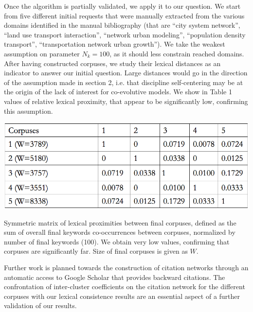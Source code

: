 



Once the algorithm is partially validated, we apply it to our question. We start from five different initial requests that were manually extracted from the various domains identified in the manual bibliography (that are ``city system network'', ``land use transport interaction'', ``network urban modeling'', ``population density transport'', ``transportation network urban growth''). We take the weakest assumption on parameter $N_k=100$, as it should less  constrain reached domains. After having constructed corpuses, we study their lexical distances as an indicator to answer our initial question. Large distances would go in the direction of the assumption made in section 2, i.e. that discipline self-centering may be at the origin of the lack of interest for co-evolutive models. We show in Table 1 values of relative lexical proximity, that appear to be significantly low, confirming this assumption.


\begin{table}
\centering
\includegraphics[width=\textwidth]{Figures/PartI/QuantitativeEpistemo/corpusesDistances}
\caption[Stationary lexical proximities]{Symmetric matrix of lexical proximities between final corpuses, defined as the sum of overall final keywords co-occurrences between corpuses, normalized by number of final keywords (100). We obtain very low values, confirming that corpuses are significantly far. Size of final corpuses is given as $W$.}
\end{table}



Further work is planned towards the construction of citation networks through an automatic access to Google Scholar that provides backward citations. The confrontation of inter-cluster coefficients on the citation network for the different corpuses with our lexical consistence results are an essential aspect of a further validation of our results.


